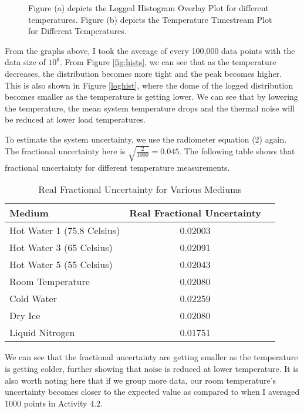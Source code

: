 \documentclass[10pt, preprint]{aastex}
\begin{document}
\begin{figure}[H]
  \centering
  \hfill
  \label{timestreams}
  \caption{\label{fig:temps} Figure (a) depicts the Logged Histogram Overlay Plot for different temperatures. Figure (b) depicts the Temperature Timestream Plot for Different Temperatures. }
\end{figure}

From the graphs above, I took the average of every 100,000 data points with the data size of $10^8$. From Figure \ref{fig:hists}, we can see that as the temperature decreases, the distribution becomes more tight and the peak becomes higher. This is also shown in Figure \ref{loghist}, where the dome of the logged distribution becomes smaller as the temperature is getting lower. 
We can see that by lowering the temperature, the mean system temperature drops and the thermal noise will be reduced at lower load temperatures.

To estimate the system uncertainty, we use the radiometer equation (2) again. The fractional uncertainty here is $\sqrt{\frac{2}{1000}} = 0.045$. The following table shows that fractional uncertainty for different temperature measurements.

\begin{table}[H]
\centering
\footnotesize
\begin{tabular}{lcr}
\hline
Medium & Real Fractional Uncertainty \\\hline
Hot Water 1 (75.8 Celsius) & 0.02003 \\
Hot Water 3 (65 Celsius) & 0.02091 \\
Hot Water 5 (55 Celsius) & 0.02043 \\
Room Temperature & 0.02080 \\
Cold Water & 0.02259 \\
Dry Ice & 0.02080 \\
Liquid Nitrogen & 0.01751 \\
\hline
\end{tabular}
\caption{\label{table:real_fractional_uncertainty}Real Fractional Uncertainty for Various Mediums}
\end{table}

We can see that the fractional uncertainty are getting smaller as the temperature is getting colder, further showing that noise is reduced at lower temperature. It is also worth noting here that if we group more data, our room temperature's uncertainty becomes closer to the expected value as compared to when I averaged 1000 points in Activity 4.2.
\end{document}

